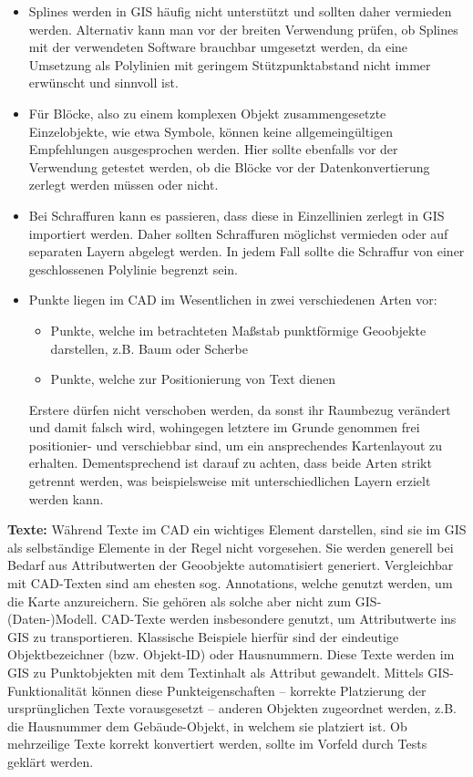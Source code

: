\begin{itemize}
	
	\item Splines werden in GIS häufig nicht unterstützt und sollten daher vermieden werden. Alternativ kann man vor der breiten Verwendung prüfen, ob Splines mit der verwendeten Software brauchbar umgesetzt werden, da eine Umsetzung als Polylinien mit geringem Stützpunktabstand nicht immer erwünscht und sinnvoll ist.
	\item Für Blöcke, also zu einem komplexen Objekt zusammengesetzte Einzelobjekte, wie etwa Symbole, können keine allgemeingültigen Empfehlungen ausgesprochen werden. Hier sollte ebenfalls vor der Verwendung getestet werden, ob die Blöcke vor der Datenkonvertierung zerlegt werden müssen oder nicht.
	\item Bei Schraffuren kann es passieren, dass diese in Einzellinien zerlegt in GIS importiert werden. Daher sollten Schraffuren möglichst vermieden oder auf separaten Layern abgelegt werden. In jedem Fall sollte die Schraffur von einer geschlossenen Polylinie begrenzt sein.
	\item Punkte liegen im CAD im Wesentlichen in zwei verschiedenen Arten vor:
	\begin{itemize}
		\item Punkte, welche im betrachteten Maßstab punktförmige Geoobjekte darstellen, z.B. Baum oder Scherbe
		\item Punkte, welche zur Positionierung von Text dienen
	\end{itemize}
	Erstere dürfen nicht verschoben werden, da sonst ihr Raumbezug verändert und damit falsch wird, wohingegen letztere im Grunde genommen frei positionier- und verschiebbar sind, um ein ansprechendes Kartenlayout zu erhalten. Dementsprechend ist darauf zu achten, dass beide Arten strikt getrennt werden, was beispielsweise mit unterschiedlichen Layern erzielt werden kann.
\end{itemize}

{\bfseries Texte:} Während Texte im CAD ein wichtiges Element darstellen, sind sie im GIS als selbständige Elemente in der Regel nicht vorgesehen. Sie werden generell bei Bedarf aus Attributwerten der Geoobjekte automatisiert generiert. Vergleichbar mit CAD-Texten sind am ehesten sog. Annotations, welche genutzt werden, um die Karte anzureichern. Sie gehören als solche aber nicht zum GIS-(Daten-)Modell. CAD-Texte werden insbesondere genutzt, um Attributwerte ins GIS zu transportieren. Klassische Beispiele hierfür sind der eindeutige Objektbezeichner (bzw. Objekt-ID) oder Hausnummern. Diese Texte werden im GIS zu Punktobjekten mit dem Textinhalt als Attribut gewandelt. Mittels GIS-Funktionalität können diese Punkteigenschaften -- korrekte Platzierung der ursprünglichen Texte vorausgesetzt -- anderen Objekten zugeordnet werden, z.B. die Hausnummer dem Gebäude-Objekt, in welchem sie platziert ist. Ob mehrzeilige Texte korrekt konvertiert werden, sollte im Vorfeld durch Tests geklärt werden.

